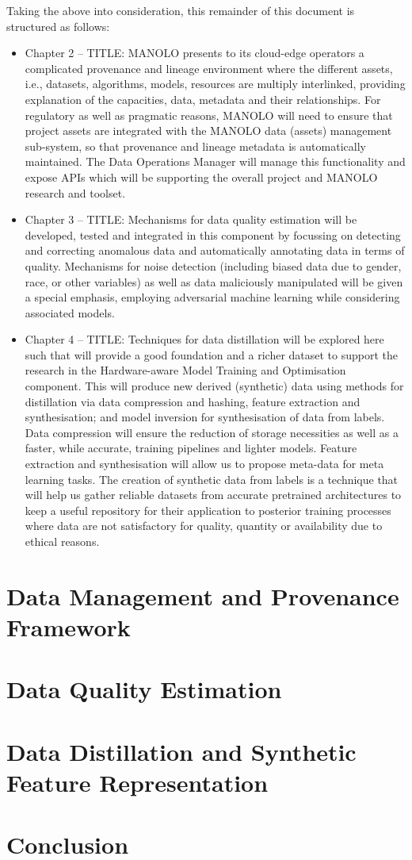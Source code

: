 \documentclass{manolo}
\begin{document}
Taking the above into consideration, this remainder of this document
is structured as follows:
%
\begin{itemize}
\item Chapter 2 -- TITLE: MANOLO presents to its cloud-edge operators
  a complicated provenance and lineage environment where the different
  assets, i.e., datasets, algorithms, models, resources are multiply
  interlinked, providing explanation of the capacities, data, metadata
  and their relationships. For regulatory as well as pragmatic
  reasons, MANOLO will need to ensure that project assets are
  integrated with the MANOLO data (assets) management sub-system, so
  that provenance and lineage metadata is automatically maintained.
  The Data Operations Manager will manage this functionality and
  expose APIs which will be supporting the overall project and MANOLO
  research and toolset.
\item Chapter 3 -- TITLE: Mechanisms for data quality estimation will
  be developed, tested and integrated in this component by focussing
  on detecting and correcting anomalous data and automatically
  annotating data in terms of quality. Mechanisms for noise detection
  (including biased data due to gender, race, or other variables) as
  well as data maliciously manipulated will be given a special
  emphasis, employing adversarial machine learning while considering
  associated models.
\item Chapter 4 -- TITLE: Techniques for data distillation will be
  explored here such that will provide a good foundation and a richer
  dataset to support the research in the Hardware-aware Model Training
  and Optimisation component. This will produce new derived
  (synthetic) data using methods for distillation via data compression
  and hashing, feature extraction and synthesisation; and model
  inversion for synthesisation of data from labels. Data compression
  will ensure the reduction of storage necessities as well as a
  faster, while accurate, training pipelines and lighter
  models. Feature extraction and synthesisation will allow us to
  propose meta-data for meta learning tasks. The creation of synthetic
  data from labels is a technique that will help us gather reliable
  datasets from accurate pretrained architectures to keep a useful
  repository for their application to posterior training processes
  where data are not satisfactory for quality, quantity or
  availability due to ethical reasons.
\end{itemize}

\section{Data Management and Provenance Framework}


\section{Data Quality Estimation}


\section{Data Distillation and Synthetic Feature Representation}


\section{Conclusion}
\end{document}
